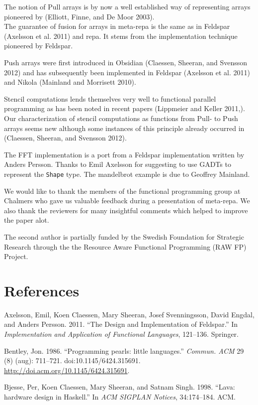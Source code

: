 \documentclass[preprint]{sigplanconf}
\begin{document}
The notion of Pull arrays is by now a well established way of
representing arrays pioneered by (Elliott, Finne, and De Moor
2003).\\The guarantee of fusion for arrays in meta-repa is the same as
in Feldspar (Axelsson et al. 2011) and repa. It stems from the
implementation technique pioneered by Feldspar.

Push arrays were first introduced in Obsidian (Claessen, Sheeran, and
Svensson 2012) and has subsequently been implemented in Feldspar
(Axelsson et al. 2011) and Nikola (Mainland and Morrisett 2010).

Stencil computations lends themselves very well to functional parallel
programming as has been noted in recent papers (Lippmeier and Keller
2011,). Our characterization of stencil computations as functions from
Pull- to Push arrays seems new although some instances of this principle
already occurred in (Claessen, Sheeran, and Svensson 2012).

\acks

The FFT implementation is a port from a Feldspar implementation written
by Anders Persson. Thanks to Emil Axelsson for suggesting to use GADTs
to represent the \texttt{Shape} type. The mandelbrot example is due to
Geoffrey Mainland.

We would like to thank the members of the functional programming group
at Chalmers who gave us valuable feedback during a presentation of
meta-repa. We also thank the reviewers for many insightful comments
which helped to improve the paper alot.

The second author is partially funded by the Swedish Foundation for
Strategic Research through the the Resource Aware Functional Programming
(RAW FP) Project.

\section{References}

Axelsson, Emil, Koen Claessen, Mary Sheeran, Josef Svenningsson, David
Engdal, and Anders Persson. 2011. ``The Design and Implementation of
Feldspar.'' In \emph{Implementation and Application of Functional
Languages}, 121--136. Springer.

Bentley, Jon. 1986. ``Programming pearls: little languages.''
\emph{Commun. ACM} 29 (8) (aug): 711--721. doi:10.1145/6424.315691.
\url{http://doi.acm.org/10.1145/6424.315691}.

Bjesse, Per, Koen Claessen, Mary Sheeran, and Satnam Singh. 1998.
``Lava: hardware design in Haskell.'' In \emph{ACM SIGPLAN Notices},
34:174--184. ACM.
\end{document}
